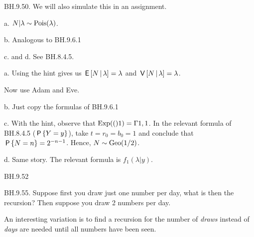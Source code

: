 \setcounter{theorem}{49}
\begin{exercise} BH.9.50.  We will also simulate this in an assignment.
\begin{hint}
a.
$N | \lambda \sim \Pois{\lambda}$.

b. Analogous to BH.9.6.1

c. and d. See BH.8.4.5.
\end{hint}
\begin{solution}
a. Using the hint gives us $\E{N\given \lambda} = \lambda$ and $\V{N\given \lambda}= \lambda$.

Now use Adam and Eve.

b. Just copy the formulas of BH.9.6.1

c. With the hint, observe that $\Exp(1)=\Gamma{1,1}$. In the relevant formula of BH.8.4.5 ($\P{Y=y}$), take $t=r_0=b_0=1$ and conclude that $\P{N=n}=2^{-n-1}$. Hence, $N\sim\Geo{1/2}$.

d. Same story. The relevant formula is $f_1(\lambda|y)$.
\end{solution}
\end{exercise}

\setcounter{theorem}{51}
\begin{exercise}
BH.9.52
\end{exercise}

\setcounter{theorem}{54}

\begin{exercise}
BH.9.55.  Suppose first you draw just one number per day, what is then the recursion? Then suppose you draw 2 numbers per day.

An interesting variation is to find a recursion for the number of \emph{draws} instead of \emph{days} are needed until all  numbers have been seen.
\end{exercise}

